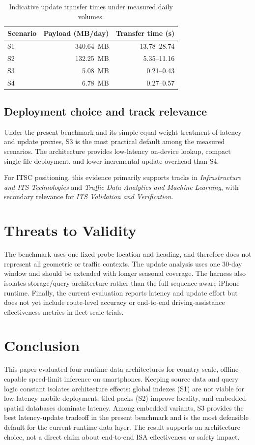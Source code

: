 \documentclass[conference]{IEEEtran}
\begin{document}
\begin{table}[!t]
\caption{Indicative update transfer times under measured daily volumes.}
\label{tab:transfer}
\centering
\begin{tabular}{lrr}
\toprule
Scenario & Payload (MB/day) & Transfer time (s) \\
\midrule
S1 & \SI{340.64}{MB} & 13.78--28.74 \\
S2 & \SI{132.25}{MB} & 5.35--11.16 \\
S3 & \SI{5.08}{MB} & 0.21--0.43 \\
S4 & \SI{6.78}{MB} & 0.27--0.57 \\
\bottomrule
\end{tabular}
\end{table}

\subsection{Deployment choice and track relevance}
Under the present benchmark and its simple equal-weight treatment of latency and update proxies, S3 is the most practical default among the measured scenarios. The architecture provides low-latency on-device lookup, compact single-file deployment, and lower incremental update overhead than S4.

For ITSC positioning, this evidence primarily supports tracks in \emph{Infrastructure and ITS Technologies} and \emph{Traffic Data Analytics and Machine Learning}, with secondary relevance for \emph{ITS Validation and Verification}.

\section{Threats to Validity}
The benchmark uses one fixed probe location and heading, and therefore does not represent all geometric or traffic contexts. The update analysis uses one 30-day window and should be extended with longer seasonal coverage. The harness also isolates storage/query architecture rather than the full sequence-aware iPhone runtime. Finally, the current evaluation reports latency and update effort but does not yet include route-level accuracy or end-to-end driving-assistance effectiveness metrics in fleet-scale trials.

\section{Conclusion}
This paper evaluated four runtime data architectures for country-scale, offline-capable speed-limit inference on smartphones. Keeping source data and query logic constant isolates architecture effects: global indexes (S1) are not viable for low-latency mobile deployment, tiled packs (S2) improve locality, and embedded spatial databases dominate latency. Among embedded variants, S3 provides the best latency-update tradeoff in the present benchmark and is the most defensible default for the current runtime-data layer. The result supports an architecture choice, not a direct claim about end-to-end ISA effectiveness or safety impact.
\end{document}
